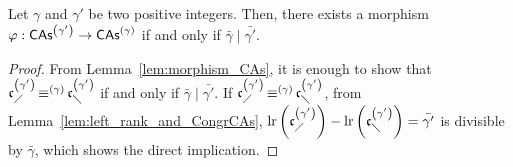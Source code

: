 \begin{Proposition} \label{prop:division_CAs}
    Let $\gamma$ and $\gamma'$ be two positive integers. Then, there
    exists a morphism $\varphi:\mathsf{CAs}^{\left(\gamma'\right)} \to \mathsf{CAs}^{\left(\gamma\right)}$ if and
    only if $\bar{\gamma} \mid \bar{\gamma'}$.
\end{Proposition}

\begin{proof}
    From Lemma~\ref{lem:morphism_CAs}, it is enough to show that
    $\mathfrak{c}^{\left(\gamma'\right)}_{\diagup} \operatorname{\equiv}^{(\gamma)} \mathfrak{c}^{\left(\gamma'\right)}_{\diagdown}$ if and only if
    $\bar{\gamma} \mid \bar{\gamma'}$. If
    $\mathfrak{c}^{\left(\gamma'\right)}_{\diagup}\operatorname{\equiv}^{(\gamma)}\mathfrak{c}^{\left(\gamma'\right)}_{\diagdown}$, from
    Lemma~\ref{lem:left_rank_and_CongrCAs},
    \begin{math}
        \mathrm{lr}\left(\mathfrak{c}^{\left(\gamma'\right)}_{\diagup}\right)
        - \mathrm{lr}\left(\mathfrak{c}^{\left(\gamma'\right)}_{\diagdown}\right)
        = \bar{\gamma'}
    \end{math}
    is divisible by $\bar{\gamma}$, which shows the direct implication.
    \smallbreak


\end{proof}
